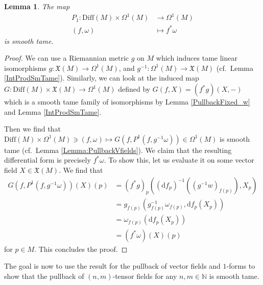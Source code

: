 \documentclass[12pt,a4paper]{article}
\theoremstyle{plain}
\newtheorem{lemma}[theorem]{Lemma}
\theoremstyle{definition}
\newcommand{\N}{\mathbb{N}}
\newcommand{\om}{\omega}
\newcommand{\VFs}{\mathfrak{X}(M)}
\newcommand{\Forms}[1]{\Omega^{#1}(M)}
\newcommand{\Diff}{\mathrm{Diff}(M)}
\renewcommand{\d}{\mathrm{d}}
\begin{document}
\begin{lemma}
\label{PullbackOneForms}
The map
\begin{align*}
    P_1:\Diff\times \Forms{1}&\longrightarrow \Forms{1}\\
    (f,\omega)&\longmapsto f^*\omega
\end{align*}
is smooth tame.
\end{lemma}
\begin{proof}
We can use a Riemannian metric $g$ on $M$ which induces tame linear isomorphisms $g:\VFs\to \Forms{1}$, and $g^{-1}:\Forms{1}\to \VFs$ (cf.~Lemma \ref{IntProdSmTame}). Similarly, we can look at the induced map $G:\Diff\times\VFs\to \Forms{1}$ defined by $G(f,X)=(f^*g)(X,-)$ which is a smooth tame family of isomorphisms by Lemma \ref{PullbackFixed_w} and Lemma \ref{IntProdSmTame}.

Then we find that $\Diff\times \Forms{1}\ni(f,\omega)\mapsto G(f,P^1(f,g^{-1}\om))\in \Forms{1}$ is smooth tame (cf.~Lemma \ref{Lemma:PullbackVfields}). We claim that the resulting differential form is precisely $f^*\omega$. To show this, let us evaluate it on some vector field $X\in \VFs$. We find that
\begin{align*}
    G(f,P^1(f,g^{-1}\omega))(X)(p)&=(f^*g)_p((\d f_p)^{-1}((g^{-1}w)_{f(p)}),X_p)\\
    &=g_{f(p)}(g^{-1}_{f(p)}\omega_{f(p)},\d f_p(X_p))\\
    &=\omega_{f(p)}(\d f_p(X_p))\\
    &=(f^*\omega)(X)(p)
\end{align*}
for $p\in M$.
This concludes the proof.
\end{proof}

The goal is now to use the result for the pullback of vector fields and $1$-forms to show that the pullback of $(n,m)$-tensor fields for any $n,m\in \N$ is smooth tame.
\end{document}

